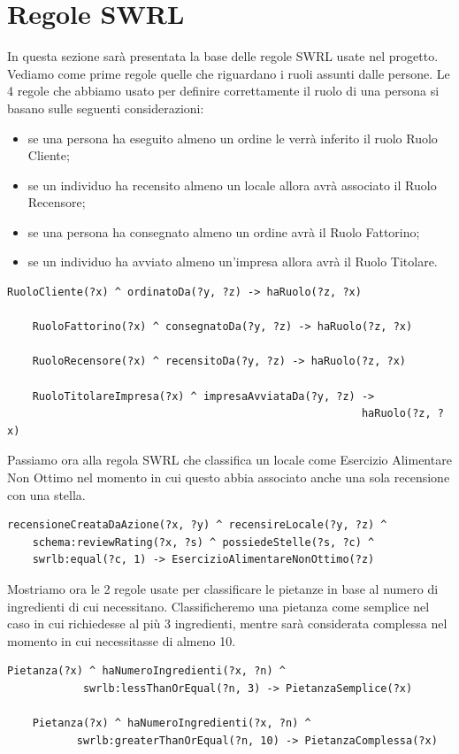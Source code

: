 \documentclass[12pt]{article}
\begin{document}
\section{Regole SWRL}
In questa sezione sarà presentata la base delle regole SWRL usate nel progetto. Vediamo come prime regole quelle che riguardano i ruoli assunti dalle persone. Le 4 regole che abbiamo usato per definire correttamente il ruolo di una persona si basano sulle seguenti considerazioni:
\begin{itemize}
    \item se una persona ha eseguito almeno un ordine le verrà inferito il ruolo Ruolo Cliente;
    \item se un individuo ha recensito almeno un locale allora avrà associato il Ruolo Recensore;
    \item se una persona ha consegnato almeno un ordine avrà il Ruolo Fattorino;
    \item se un individuo ha avviato almeno un'impresa allora avrà il Ruolo Titolare.
\end{itemize}
\begin{lstlisting}[language=SPARQL]
    RuoloCliente(?x) ^ ordinatoDa(?y, ?z) -> haRuolo(?z, ?x)
    
    RuoloFattorino(?x) ^ consegnatoDa(?y, ?z) -> haRuolo(?z, ?x)
    
    RuoloRecensore(?x) ^ recensitoDa(?y, ?z) -> haRuolo(?z, ?x)
    
    RuoloTitolareImpresa(?x) ^ impresaAvviataDa(?y, ?z) -> 
                                                        haRuolo(?z, ?x)
\end{lstlisting}
Passiamo ora alla regola SWRL che classifica un locale come Esercizio Alimentare Non Ottimo nel momento in cui questo abbia associato anche una sola recensione con una stella.
\begin{lstlisting}[language=SPARQL]
    recensioneCreataDaAzione(?x, ?y) ^ recensireLocale(?y, ?z) ^
    schema:reviewRating(?x, ?s) ^ possiedeStelle(?s, ?c) ^
    swrlb:equal(?c, 1) -> EsercizioAlimentareNonOttimo(?z)
\end{lstlisting}
Mostriamo ora le 2 regole usate per classificare le pietanze in base al numero di ingredienti di cui necessitano. Classificheremo una pietanza come semplice nel caso in cui richiedesse al più 3 ingredienti, mentre sarà considerata complessa nel momento in cui necessitasse di almeno 10.
\begin{lstlisting}[language=SPARQL]
    Pietanza(?x) ^ haNumeroIngredienti(?x, ?n) ^ 
            swrlb:lessThanOrEqual(?n, 3) -> PietanzaSemplice(?x)
    
    Pietanza(?x) ^ haNumeroIngredienti(?x, ?n) ^ 
           swrlb:greaterThanOrEqual(?n, 10) -> PietanzaComplessa(?x)
\end{lstlisting}
\end{document}
